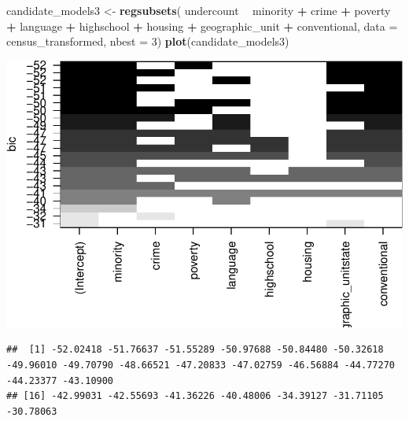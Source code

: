 \documentclass[landscape]{article}
\newenvironment{Shaded}{\begin{snugshade}}{\end{snugshade}}
\newcommand{\KeywordTok}[1]{\textcolor[rgb]{0.13,0.29,0.53}{\textbf{#1}}}
\newcommand{\DataTypeTok}[1]{\textcolor[rgb]{0.13,0.29,0.53}{#1}}
\newcommand{\DecValTok}[1]{\textcolor[rgb]{0.00,0.00,0.81}{#1}}
\newcommand{\StringTok}[1]{\textcolor[rgb]{0.31,0.60,0.02}{#1}}
\newcommand{\OperatorTok}[1]{\textcolor[rgb]{0.81,0.36,0.00}{\textbf{#1}}}
\newcommand{\NormalTok}[1]{#1}
\begin{document}
\begin{Shaded}
\begin{Highlighting}[]
\NormalTok{candidate_models3 <-}\StringTok{ }\KeywordTok{regsubsets}\NormalTok{(}
\NormalTok{  undercount }\OperatorTok{~}\StringTok{ }\NormalTok{minority }\OperatorTok{+}\StringTok{ }\NormalTok{crime }\OperatorTok{+}\StringTok{ }\NormalTok{poverty }\OperatorTok{+}\StringTok{ }\NormalTok{language }\OperatorTok{+}\StringTok{ }\NormalTok{highschool }\OperatorTok{+}\StringTok{ }\NormalTok{housing }\OperatorTok{+}\StringTok{ }\NormalTok{geographic_unit }\OperatorTok{+}\StringTok{ }\NormalTok{conventional,}
  \DataTypeTok{data =}\NormalTok{ census_transformed,}
  \DataTypeTok{nbest =} \DecValTok{3}\NormalTok{)}
\KeywordTok{plot}\NormalTok{(candidate_models3)}
\end{Highlighting}
\end{Shaded}

\includegraphics{20190422_multicollinearity_files/figure-latex/unnamed-chunk-16-1.pdf}

\begin{Shaded}
\end{Shaded}

\begin{verbatim}
##  [1] -52.02418 -51.76637 -51.55289 -50.97688 -50.84480 -50.32618 -49.96010 -49.70790 -48.66521 -47.20833 -47.02759 -46.56884 -44.77270 -44.23377 -43.10900
## [16] -42.99031 -42.55693 -41.36226 -40.48006 -34.39127 -31.71105 -30.78063
\end{verbatim}
\end{document}
